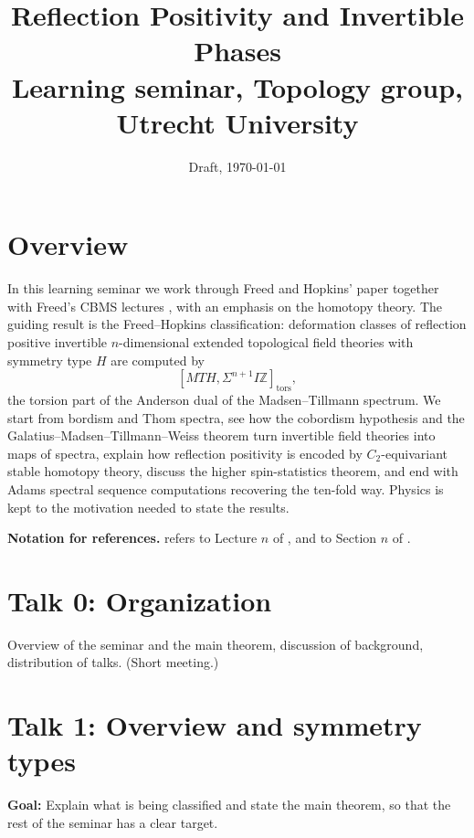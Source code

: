 \documentclass[11pt,a4paper]{article}
\title{Reflection Positivity and Invertible Phases\\[4pt]
\large Learning seminar, Topology group, Utrecht University}
\author{}
\date{Draft, \today}
\newcommand{\MT}{\mathit{MT}}
\newcommand{\IZ}{I\mathbb{Z}}
\newcommand{\talk}[2]{\section*{Talk #1: #2}}
\begin{document}
\maketitle

\section*{Overview}

In this learning seminar we work through Freed and Hopkins' paper \cite{FH} together with Freed's CBMS lectures \cite{F}, with an emphasis on the homotopy theory. The guiding result is the Freed--Hopkins classification: deformation classes of reflection positive invertible $n$-dimensional extended topological field theories with symmetry type $H$ are computed by
\[
  [\MT H, \Sigma^{n+1}\IZ]_{\mathrm{tors}},
\]
the torsion part of the Anderson dual of the Madsen--Tillmann spectrum. We start from bordism and Thom spectra, see how the cobordism hypothesis and the Galatius--Madsen--Tillmann--Weiss theorem turn invertible field theories into maps of spectra, explain how reflection positivity is encoded by $C_2$-equivariant stable homotopy theory, discuss the higher spin-statistics theorem, and end with Adams spectral sequence computations recovering the ten-fold way. Physics is kept to the motivation needed to state the results.

\textbf{Notation for references.} \cite[L$n$]{F} refers to Lecture $n$ of \cite{F}, and \cite[\S$n$]{FH} to Section $n$ of \cite{FH}.


\talk{0}{Organization}

Overview of the seminar and the main theorem, discussion of background, distribution of talks. (Short meeting.)

\talk{1}{Overview and symmetry types}

\textbf{Goal:} Explain what is being classified and state the main theorem, so that the rest of the seminar has a clear target.
\end{document}
